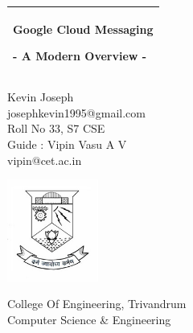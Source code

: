 %
%
%
%
%
\begin{titlepage}
  \addtolength{\hoffset}{0.5\evensidemargin-0.5\oddsidemargin} %
  \noindent%
  \begin{tabular}{@{}p{\textwidth}@{}}
    \toprule[2pt]
    \midrule
    \vspace{0.2cm}
    \begin{center}
    \Huge{\textbf{
      Google Cloud Messaging%
    }}
    \end{center}
    \begin{center}
      \Large{
        - A Modern Overview -%
      }
    \end{center}
    \vspace{0.2cm}\\
    \midrule
    \toprule[2pt]
  \end{tabular}
  \vspace{4 cm}
  \begin{center}
    {\Large
      Kevin Joseph%
    }\\
    {\large
      josephkevin1995@gmail.com%
    }\\
    {\large
      Roll No 33, S7 CSE%
    }\\
    \vspace{1cm}
    {\Large
      Guide : Vipin Vasu A V%
    }\\
    {\large
      vipin@cet.ac.in%
    }\\
  \end{center}
  \vfill
  \centering\includegraphics[width=3cm]{figures/logo.jpg}
  \begin{center}

  College Of Engineering, Trivandrum\\
  Computer Science \& Engineering
  \end{center}
\end{titlepage}
